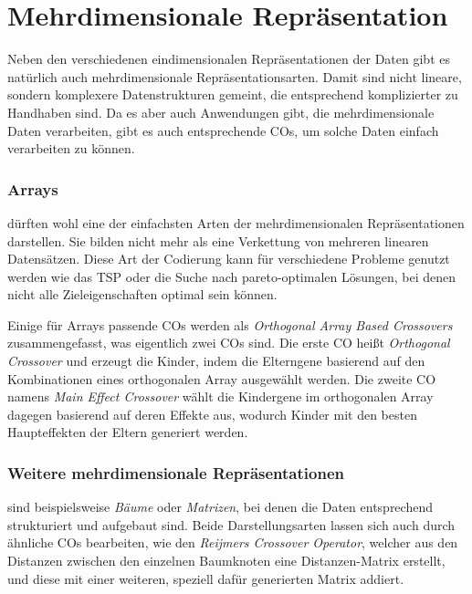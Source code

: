 
\section{Mehrdimensionale Repräsentation}
\label{sec:MehrdimRep}

	Neben den verschiedenen eindimensionalen Repräsentationen der Daten gibt es natürlich auch mehrdimensionale Repräsentationsarten. Damit sind nicht lineare, sondern komplexere Datenstrukturen gemeint, die entsprechend komplizierter zu Handhaben sind. Da es aber auch Anwendungen gibt, die mehrdimensionale Daten verarbeiten, gibt es auch entsprechende COs, um solche Daten einfach verarbeiten zu können.
	
	\subsubsection{Arrays}
	\label{sec:Arrays}
	
		dürften wohl eine der einfachsten Arten der mehrdimensionalen Re\-prä\-sen\-ta\-ti\-on\-en darstellen. Sie bilden nicht mehr als eine Verkettung von mehreren linearen Datensätzen. Diese Art der Codierung kann für verschiedene Probleme genutzt werden wie \zB das TSP oder die Suche nach pareto-optimalen Lösungen, bei denen nicht alle Zieleigenschaften optimal sein können.
		
		Einige für Arrays passende COs werden als \textit{Orthogonal Array Based Cross\-overs} zusammengefasst, was eigentlich zwei COs sind. Die erste CO heißt \textit{Orthogonal Crossover} und erzeugt die Kinder, indem die Elterngene basierend auf den Kombinationen eines orthogonalen Array ausgewählt werden. Die zweite CO namens \textit{Main Effect Crossover}  wählt die Kindergene im orthogonalen Array dagegen basierend auf deren Effekte aus, wodurch Kinder mit den besten Haupteffekten der Eltern generiert werden. \cite{ArrayCrossover}
	
	\subsubsection{Weitere mehrdimensionale Repräsentationen}
	\label{sec:WeitereMehrdim}
	
		sind beispielsweise \textit{Bäume} oder \textit{Matrizen}, bei denen die Daten entsprechend strukturiert und aufgebaut sind. Beide Darstellungsarten lassen sich \uA auch durch ähnliche COs bearbeiten, wie \zB den \textit{Reijmers Crossover Operator}, welcher aus den Distanzen zwischen den einzelnen Baumknoten eine Distanzen-Matrix erstellt, und diese mit einer weiteren, speziell dafür generierten Matrix addiert. \cite{MatrixCO}

